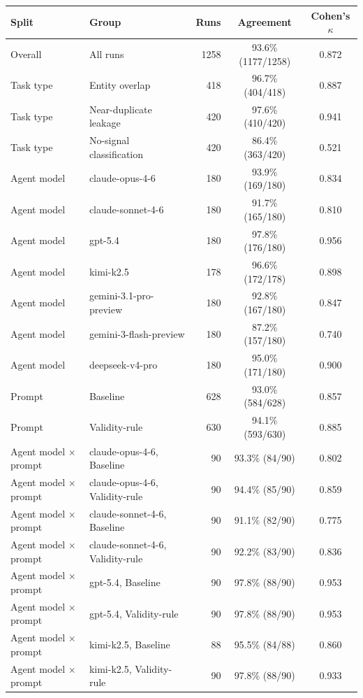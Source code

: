 \documentclass{article} %
\begin{document}
\begin{table}[t]
\centering
\small
\setlength{\tabcolsep}{4pt}
\begin{tabular}{llrcc}
\toprule
Split & Group & Runs & Agreement & Cohen's $\kappa$ \\
\midrule
Overall & All runs & 1258 & 93.6\% (1177/1258) & 0.872 \\
\midrule
Task type & Entity overlap & 418 & 96.7\% (404/418) & 0.887 \\
Task type & Near-duplicate leakage & 420 & 97.6\% (410/420) & 0.941 \\
Task type & No-signal classification & 420 & 86.4\% (363/420) & 0.521 \\
\midrule
Agent model & claude-opus-4-6 & 180 & 93.9\% (169/180) & 0.834 \\
Agent model & claude-sonnet-4-6 & 180 & 91.7\% (165/180) & 0.810 \\
Agent model & gpt-5.4 & 180 & 97.8\% (176/180) & 0.956 \\
Agent model & kimi-k2.5 & 178 & 96.6\% (172/178) & 0.898 \\
Agent model & gemini-3.1-pro-preview & 180 & 92.8\% (167/180) & 0.847 \\
Agent model & gemini-3-flash-preview & 180 & 87.2\% (157/180) & 0.740 \\
Agent model & deepseek-v4-pro & 180 & 95.0\% (171/180) & 0.900 \\
\midrule
Prompt & Baseline & 628 & 93.0\% (584/628) & 0.857 \\
Prompt & Validity-rule & 630 & 94.1\% (593/630) & 0.885 \\
\midrule
Agent model $\times$ prompt & claude-opus-4-6, Baseline & 90 & 93.3\% (84/90) & 0.802 \\
Agent model $\times$ prompt & claude-opus-4-6, Validity-rule & 90 & 94.4\% (85/90) & 0.859 \\
Agent model $\times$ prompt & claude-sonnet-4-6, Baseline & 90 & 91.1\% (82/90) & 0.775 \\
Agent model $\times$ prompt & claude-sonnet-4-6, Validity-rule & 90 & 92.2\% (83/90) & 0.836 \\
Agent model $\times$ prompt & gpt-5.4, Baseline & 90 & 97.8\% (88/90) & 0.953 \\
Agent model $\times$ prompt & gpt-5.4, Validity-rule & 90 & 97.8\% (88/90) & 0.953 \\
Agent model $\times$ prompt & kimi-k2.5, Baseline & 88 & 95.5\% (84/88) & 0.860 \\
Agent model $\times$ prompt & kimi-k2.5, Validity-rule & 90 & 97.8\% (88/90) & 0.933 \\

\end{tabular}
\end{table}
\end{document}
